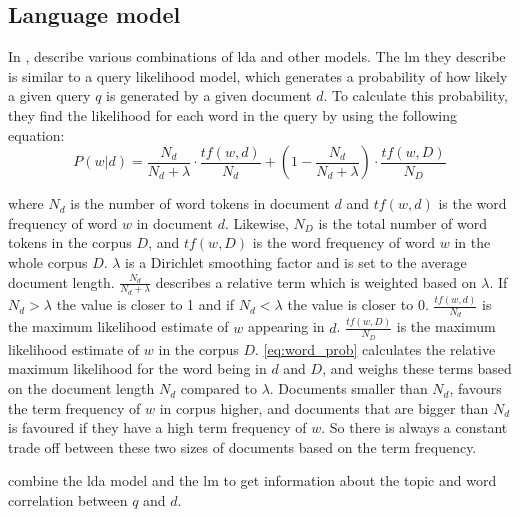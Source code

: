 \subsection{Language model}\label{sec:lm}
In \cite{yang2009topic}, \citeauthor{yang2009topic} describe various combinations of \gls{lda} and other models. 
The \acrlong{lm} they describe is similar to a query likelihood model, which generates a probability of how likely a given query $q$ is generated by a given document $d$.
To calculate this probability, they find the likelihood for each word in the query by using the following equation:
\begin{equation}\label{eq:word_prob}
	P(w|d) = \frac{N_d}{N_d + \lambda} \cdot \frac{tf(w,d)}{N_d} + (1 - \frac{N_d}{N_d + \lambda}) \cdot \frac{tf(w,D)}{N_D}
\end{equation}

where $N_d$ is the number of word tokens in document $d$ and $tf(w,d)$ is the word frequency of word $w$ in document $d$. Likewise, $N_D$ is the total number of word tokens in the corpus $D$, and $tf(w,D)$ is the word frequency of word $w$ in the whole corpus $D$. $\lambda$ is a Dirichlet smoothing factor and is set to the average document length.
$ \frac{N_d}{N_d + \lambda} $ describes a relative term which is weighted based on $ \lambda $. If $N_d > \lambda$ the value is closer to 1 and if $ N_d < \lambda $ the value is closer to 0.
$\frac{tf(w,d)}{N_d}$ is the maximum likelihood estimate of $w$ appearing in $d$.
$\frac{tf(w,D)}{N_D}$ is the maximum likelihood estimate of $w$ in the corpus $D$.
\autoref{eq:word_prob} calculates the relative maximum likelihood for the word being in $ d $ and $ D $, and weighs these terms based on the document length $N_d$ compared to $\lambda$.
Documents smaller than $N_d$, favours the term frequency of $w$ in corpus higher, and documents that are bigger than $N_d$ is favoured if they have a high term frequency of $w$.
So there is always a constant trade off between these two sizes of documents based on the term frequency.

\cite{yang2009topic} combine the \gls{lda} model and the \gls{lm} to get information about the topic and word correlation between $q$ and $d$.
